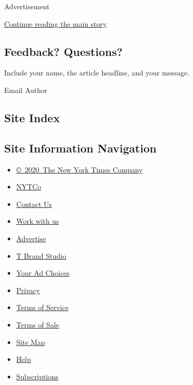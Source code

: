 Advertisement

\protect\hyperlink{after-mid2}{Continue reading the main story}

\hypertarget{feedback-questions}{%
\subsection{Feedback? Questions?}\label{feedback-questions}}

Include your name, the article headline, and your message.

Email Author

\hypertarget{site-index}{%
\subsection{Site Index}\label{site-index}}

\hypertarget{site-information-navigation}{%
\subsection{Site Information
Navigation}\label{site-information-navigation}}

\begin{itemize}
\tightlist
\item
  \href{https://help.nytimes.com/hc/en-us/articles/115014792127-Copyright-notice}{©~2020~The
  New York Times Company}
\end{itemize}

\begin{itemize}
\tightlist
\item
  \href{https://www.nytco.com/}{NYTCo}
\item
  \href{https://help.nytimes.com/hc/en-us/articles/115015385887-Contact-Us}{Contact
  Us}
\item
  \href{https://www.nytco.com/careers/}{Work with us}
\item
  \href{https://nytmediakit.com/}{Advertise}
\item
  \href{http://www.tbrandstudio.com/}{T Brand Studio}
\item
  \href{https://www.nytimes.com/privacy/cookie-policy\#how-do-i-manage-trackers}{Your
  Ad Choices}
\item
  \href{https://www.nytimes.com/privacy}{Privacy}
\item
  \href{https://help.nytimes.com/hc/en-us/articles/115014893428-Terms-of-service}{Terms
  of Service}
\item
  \href{https://help.nytimes.com/hc/en-us/articles/115014893968-Terms-of-sale}{Terms
  of Sale}
\item
  \href{https://spiderbites.nytimes.com}{Site Map}
\item
  \href{https://help.nytimes.com/hc/en-us}{Help}
\item
  \href{https://www.nytimes.com/subscription?campaignId=37WXW}{Subscriptions}
\end{itemize}
